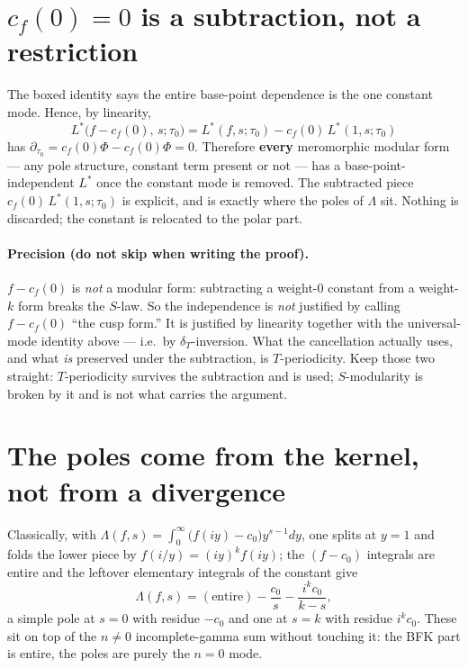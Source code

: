 \documentclass[11pt]{article}
\newcommand{\dT}{\delta_T}
\begin{document}
\section*{$c_f(0)=0$ is a subtraction, not a restriction}

The boxed identity says the entire base-point dependence is the one constant mode.
Hence, by linearity,
\[
  L^*\!\big(f-c_f(0),\,s;\tau_0\big)=L^*(f,s;\tau_0)-c_f(0)\,L^*(1,s;\tau_0)
\]
has $\partial_{\tau_0}=c_f(0)\Phi-c_f(0)\Phi=0$. Therefore \textbf{every} meromorphic
modular form --- any pole structure, constant term present or not --- has a
base-point-independent $L^*$ once the constant mode is removed. The subtracted piece
$c_f(0)\,L^*(1,s;\tau_0)$ is explicit, and is exactly where the poles of $\Lambda$
sit. Nothing is discarded; the constant is relocated to the polar part.

\paragraph{Precision (do not skip when writing the proof).}
$f-c_f(0)$ is \emph{not} a modular form: subtracting a weight-$0$ constant from a
weight-$k$ form breaks the $S$-law. So the independence is \emph{not} justified by
calling $f-c_f(0)$ ``the cusp form.'' It is justified by linearity together with the
universal-mode identity above --- i.e.\ by $\dT$-inversion. What the cancellation
actually uses, and what \emph{is} preserved under the subtraction, is
$T$-periodicity. Keep those two straight: $T$-periodicity survives the subtraction
and is used; $S$-modularity is broken by it and is not what carries the argument.

\section*{The poles come from the kernel, not from a divergence}

Classically, with $\Lambda(f,s)=\int_0^\infty\!\big(f(iy)-c_0\big)y^{s-1}dy$, one splits
at $y=1$ and folds the lower piece by $f(i/y)=(iy)^k f(iy)$; the $(f-c_0)$ integrals
are entire and the leftover elementary integrals of the constant give
\[
  \Lambda(f,s)=(\text{entire})-\frac{c_0}{s}-\frac{i^k c_0}{k-s},
\]
a simple pole at $s=0$ with residue $-c_0$ and one at $s=k$ with residue $i^k c_0$.
These sit on top of the $n\neq0$ incomplete-gamma sum without touching it: the BFK
part is entire, the poles are purely the $n=0$ mode.
\end{document}
